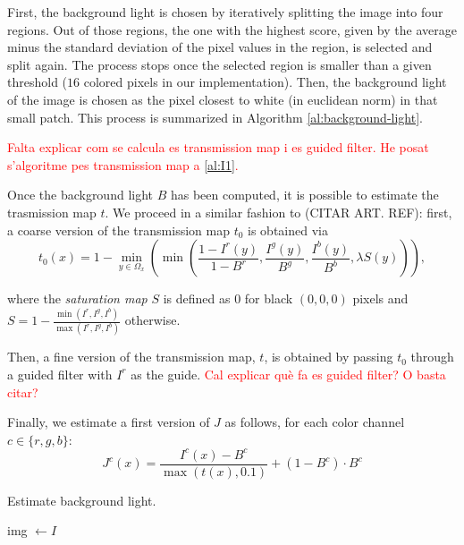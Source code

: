 \documentclass[twocolumn,twoside,a4paper,10pt]{IEEEtran}
\newcommand{\Frank}[1]{\textcolor{red}{#1}}
\begin{document}
First, the background light is chosen by iteratively splitting the image into four regions. Out of those regions, the one with the highest score, given by the average minus the standard deviation of the pixel values in the region, is selected and split again. The process stops once the selected region is smaller than a given threshold (\(16\) colored pixels in our implementation). Then, the background light of the image is chosen as the pixel closest to white (in euclidean norm) in that small patch. This process is summarized in Algorithm \ref{al:background-light}.

\Frank{Falta explicar com se calcula es transmission map i es guided filter. He posat s'algoritme pes transmission map a \ref{al:I1}.}

Once the background light \(B\) has been computed, it is possible to estimate the trasmission map \(t\). We proceed in a similar fashion to (CITAR ART. REF): first, a coarse version of the transmission map \(t_0\) is obtained via
\[
  t_0(x) = 1 - \min_{y\in\Omega_x}\left(\min\left(\frac{1-I^r(y)}{1-B^r}, \frac{I^g(y)}{B^g}, \frac{I^b(y)}{B^b}, \lambda S(y)\right)\right)
,\]

where the \textit{saturation map} \(S\) is defined as \(0\) for black \((0, 0, 0)\) pixels and \(S=1-\frac{\min(I^r, I^g, I^b)}{\max(I^r, I^g, I^b)}\) otherwise.

Then, a fine version of the transmission map, \(t\), is obtained by passing \(t_0\) through a guided filter with \(I^r\) as the guide. \Frank{Cal explicar què fa es guided filter? O basta citar?}

Finally, we estimate a first version of \(J\) as follows, for each color channel \(c\in\{r, g, b\}\):
\begin{equation}\label{eq:J0}
  J^c(x) = \frac{I^c(x) - B^c}{\max(t(x), 0.1)} + (1-B^c)\cdot B^c
\end{equation}

\begin{algorithm}\label{al:background-light}
\caption{Estimate background light.}

img \(\gets I\)\;
\end{algorithm}
\end{document}
